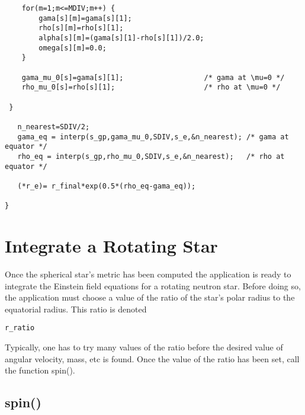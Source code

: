 \begin{verbatim}
    for(m=1;m<=MDIV;m++) {
        gama[s][m]=gama[s][1];        
        rho[s][m]=rho[s][1];
        alpha[s][m]=(gama[s][1]-rho[s][1])/2.0;
        omega[s][m]=0.0; 
    }
 
    gama_mu_0[s]=gama[s][1];                   /* gama at \mu=0 */
    rho_mu_0[s]=rho[s][1];                     /* rho at \mu=0 */

 }

   n_nearest=SDIV/2;
   gama_eq = interp(s_gp,gama_mu_0,SDIV,s_e,&n_nearest); /* gama at equator */
   rho_eq = interp(s_gp,rho_mu_0,SDIV,s_e,&n_nearest);   /* rho at equator */
 
   (*r_e)= r_final*exp(0.5*(rho_eq-gama_eq)); 

}

\end{verbatim}

\section{Integrate a Rotating Star}

Once the spherical star's metric has been computed the application
is ready to integrate the Einstein field equations for a rotating 
neutron star. Before doing so, the application must choose 
a value of the ratio of the star's polar radius to the equatorial radius.
This ratio is denoted
\begin{verbatim}
r_ratio
\end{verbatim}
Typically, one has to try many values of the ratio before the 
desired value of angular velocity, mass, etc is found. Once the value
of the ratio has been set, call the function spin().

\subsection{spin()}

